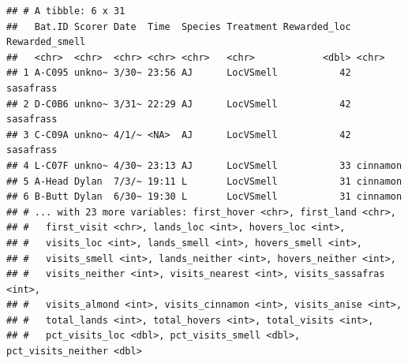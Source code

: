 \documentclass[]{article}
\newenvironment{Shaded}{\begin{snugshade}}{\end{snugshade}}
\newcommand{\KeywordTok}[1]{\textcolor[rgb]{0.13,0.29,0.53}{\textbf{{#1}}}}
\newcommand{\StringTok}[1]{\textcolor[rgb]{0.31,0.60,0.02}{{#1}}}
\newcommand{\NormalTok}[1]{{#1}}
\begin{document}
\begin{verbatim}
## # A tibble: 6 x 31
##   Bat.ID Scorer Date  Time  Species Treatment Rewarded_loc Rewarded_smell
##   <chr>  <chr>  <chr> <chr> <chr>   <chr>            <dbl> <chr>         
## 1 A-C095 unkno~ 3/30~ 23:56 AJ      LocVSmell           42 sasafrass     
## 2 D-C0B6 unkno~ 3/31~ 22:29 AJ      LocVSmell           42 sasafrass     
## 3 C-C09A unkno~ 4/1/~ <NA>  AJ      LocVSmell           42 sasafrass     
## 4 L-C07F unkno~ 4/30~ 23:13 AJ      LocVSmell           33 cinnamon      
## 5 A-Head Dylan  7/3/~ 19:11 L       LocVSmell           31 cinnamon      
## 6 B-Butt Dylan  6/30~ 19:30 L       LocVSmell           31 cinnamon      
## # ... with 23 more variables: first_hover <chr>, first_land <chr>,
## #   first_visit <chr>, lands_loc <int>, hovers_loc <int>,
## #   visits_loc <int>, lands_smell <int>, hovers_smell <int>,
## #   visits_smell <int>, lands_neither <int>, hovers_neither <int>,
## #   visits_neither <int>, visits_nearest <int>, visits_sassafras <int>,
## #   visits_almond <int>, visits_cinnamon <int>, visits_anise <int>,
## #   total_lands <int>, total_hovers <int>, total_visits <int>,
## #   pct_visits_loc <dbl>, pct_visits_smell <dbl>, pct_visits_neither <dbl>
\end{verbatim}

\begin{Shaded}
\end{Shaded}
\end{document}
